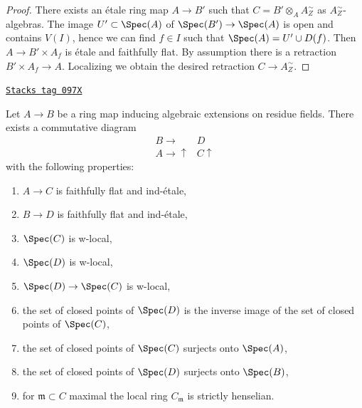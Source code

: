 \begin{proof}
There exists an \'etale ring map $A \to B'$ such that
$C = B' \otimes_A A_Z^\sim$ as $A_Z^\sim$-algebras.
The image $U' \subset \Spec(A)$ of $\Spec(B') \to \Spec(A)$
is open and contains $V(I)$, hence we can find $f \in I$ such
that $\Spec(A) = U' \cup D(f)$. Then $A \to B' \times A_f$
is \'etale and faithfully flat. By assumption there is a retraction
$B' \times A_f \to A$. Localizing we obtain the desired retraction
$C \to A_Z^\sim$.
\end{proof}

\begin{lemma}
\label{proetale-lemma-get-w-local-algebraic-residue-field-extensions}
\href{https://stacks.math.columbia.edu/tag/097X}{\texttt{Stacks tag 097X}}

Let $A \to B$ be a ring map inducing algebraic extensions on residue fields.
There exists a commutative diagram
$$
\begin{array}{cc}B \longrightarrow & D \\ A \longrightarrow\uparrow & C \uparrow\end{array}
$$
with the following properties:
\begin{enumerate}
\item $A \to C$ is faithfully flat and ind-\'etale,
\item $B \to D$ is faithfully flat and ind-\'etale,
\item $\Spec(C)$ is w-local,
\item $\Spec(D)$ is w-local,
\item $\Spec(D) \to \Spec(C)$ is w-local,
\item the set of closed points of $\Spec(D)$ is the inverse image
of the set of closed points of $\Spec(C)$,
\item the set of closed points of $\Spec(C)$ surjects onto $\Spec(A)$,
\item the set of closed points of $\Spec(D)$ surjects onto $\Spec(B)$,
\item for $\mathfrak m \subset C$ maximal the local ring
$C_\mathfrak m$ is strictly henselian.
\end{enumerate}
\end{lemma}

